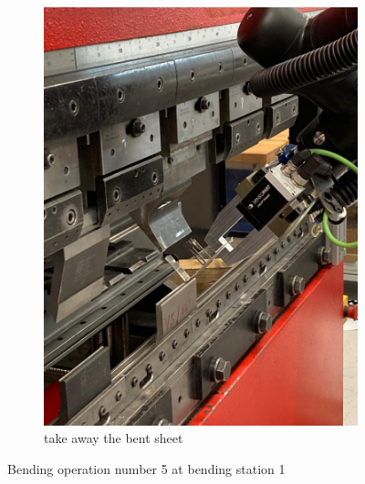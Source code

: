 \begin{figure}[h]
\begin{subfigure}[b]{0.32\textwidth}
        \includegraphics[width=\textwidth]{figures/bending/bending5-003.png}
        \caption{take away the bent sheet}
        \label{subfig:bending5-after}
    \end{subfigure}\hspace{0.1cm}
    \caption{Bending operation number 5 at bending station 1}
    \label{fig:bending-operation-5}
\end{figure}


